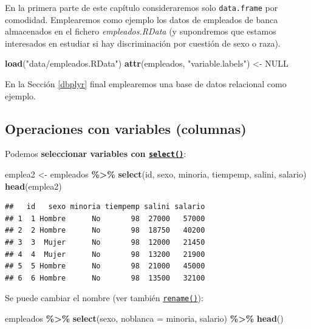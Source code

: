 \documentclass[
]{book}
\newenvironment{Shaded}{\begin{snugshade}}{\end{snugshade}}
\newcommand{\AttributeTok}[1]{\textcolor[rgb]{0.13,0.29,0.53}{#1}}
\newcommand{\ConstantTok}[1]{\textcolor[rgb]{0.56,0.35,0.01}{#1}}
\newcommand{\FunctionTok}[1]{\textcolor[rgb]{0.13,0.29,0.53}{\textbf{#1}}}
\newcommand{\NormalTok}[1]{#1}
\newcommand{\OtherTok}[1]{\textcolor[rgb]{0.56,0.35,0.01}{#1}}
\newcommand{\SpecialCharTok}[1]{\textcolor[rgb]{0.81,0.36,0.00}{\textbf{#1}}}
\newcommand{\StringTok}[1]{\textcolor[rgb]{0.31,0.60,0.02}{#1}}
\theoremstyle{break}
\theoremstyle{nonumberplain}
\begin{document}
En la primera parte de este capítulo consideraremos solo \texttt{data.frame} por comodidad.
Emplearemos como ejemplo los datos de empleados de banca almacenados en el fichero \emph{empleados.RData} (y supondremos que estamos interesados en estudiar si hay discriminación por cuestión de sexo o raza).

\begin{Shaded}
\begin{Highlighting}[]
\FunctionTok{load}\NormalTok{(}\StringTok{"data/empleados.RData"}\NormalTok{)}
\FunctionTok{attr}\NormalTok{(empleados, }\StringTok{"variable.labels"}\NormalTok{) }\OtherTok{\textless{}{-}} \ConstantTok{NULL}                  
\end{Highlighting}
\end{Shaded}

En la Sección \ref{dbplyr} final emplearemos una base de datos relacional como ejemplo.

\subsection{Operaciones con variables (columnas)}\label{dplyr-variables}

Podemos \textbf{seleccionar variables con \href{https://dplyr.tidyverse.org/reference/select.html}{\texttt{select()}}}:

\begin{Shaded}
\begin{Highlighting}[]
\NormalTok{emplea2 }\OtherTok{\textless{}{-}}\NormalTok{ empleados }\SpecialCharTok{\%\textgreater{}\%} \FunctionTok{select}\NormalTok{(id, sexo, minoria, tiempemp, }
\NormalTok{                                salini, salario)}
\FunctionTok{head}\NormalTok{(emplea2)}
\end{Highlighting}
\end{Shaded}

\begin{verbatim}
##   id   sexo minoria tiempemp salini salario
## 1  1 Hombre      No       98  27000   57000
## 2  2 Hombre      No       98  18750   40200
## 3  3  Mujer      No       98  12000   21450
## 4  4  Mujer      No       98  13200   21900
## 5  5 Hombre      No       98  21000   45000
## 6  6 Hombre      No       98  13500   32100
\end{verbatim}

Se puede cambiar el nombre (ver también \href{https://dplyr.tidyverse.org/reference/rename.html}{\texttt{rename()}}):

\begin{Shaded}
\begin{Highlighting}[]
\NormalTok{empleados }\SpecialCharTok{\%\textgreater{}\%} \FunctionTok{select}\NormalTok{(sexo, }\AttributeTok{noblanca =}\NormalTok{ minoria, salario) }\SpecialCharTok{\%\textgreater{}\%} \FunctionTok{head}\NormalTok{()}
\end{Highlighting}
\end{Shaded}
\end{document}
